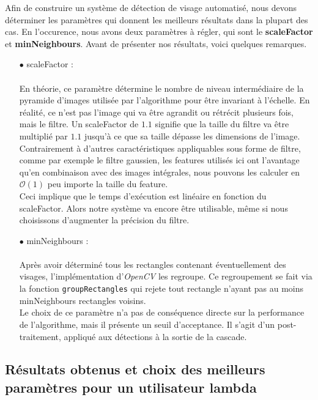\documentclass[a4paper,11pt]{article}
\begin{document}
        Afin de construire un système de détection de visage automatisé, nous devons déterminer les paramètres qui donnent les meilleurs résultats dans la plupart des cas.
        En l'occurence, nous avons deux paramètres à régler, qui sont le {\bf scaleFactor} et {\bf minNeighbours}.
        Avant de présenter nos résultats, voici quelques remarques.\\
        \begin{itemize}
            \item[$\bullet$] scaleFactor :\\\\
                En théorie, ce paramètre détermine le nombre de niveau intermédiaire de la pyramide d'images utilisée par l'algorithme pour être invariant à l'échelle.
                En réalité, ce n'est pas l'image qui va être agrandit ou rétrécit plusieurs fois, mais le filtre.
                Un scaleFactor de $1.1$ signifie que la taille du filtre va être multiplié par $1.1$ jusqu'à ce que sa taille dépasse les dimensions de l'image.
                Contrairement à d'autres caractéristiques appliquables sous forme de filtre, comme par exemple le filtre gaussien, les features utilisés ici ont l'avantage qu'en combinaison avec des images intégrales, nous pouvons les calculer en $\mathcal{O}(1)$ peu importe la taille du feature.
                \\
                Ceci implique que le temps d'exécution est linéaire en fonction du scaleFactor.
                Alors notre système va encore être utilisable, même si nous choisissons d'augmenter la précision du filtre.\\
            \item[$\bullet$] minNeighbours :\\\\
                Après avoir déterminé tous les rectangles contenant éventuellement des visages, l'implémentation d'{\it OpenCV} les regroupe.
                Ce regroupement se fait via la fonction \verb!groupRectangles! qui rejete tout rectangle n'ayant pas au moins minNeighbours rectangles voisins.
                \\
                Le choix de ce paramètre n'a pas de conséquence directe sur la performance de l'algorithme, mais il présente un seuil d'acceptance.
                Il s'agit d'un post-traitement, appliqué aux détections à la sortie de la cascade.
        \end{itemize}

        \subsection{Résultats obtenus et choix des meilleurs paramètres pour un utilisateur lambda}
\end{document}
